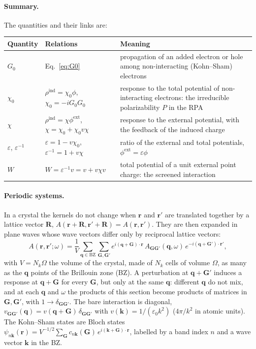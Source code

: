 \documentclass[10pt,a4paper]{paper}
\begin{document}
\paragraph{Summary.} The quantities and their links are:
\begin{center}
\begin{tabular}{p{}p{}>{\raggedright\arraybackslash}p{}}
\toprule
Quantity & Relations & Meaning \\
\midrule
$G_0$ & Eq.~\eqref{eq:G0} &
  propagation of an added electron or hole among non-interacting (Kohn--Sham) electrons \\
$\chi_0$ & $\rho^{\mathrm{ind}} = \chi_0\phi$, \quad $\chi_0 = -iG_0G_0$ &
  response to the total potential of non-interacting electrons: the irreducible polarizability $P$ in the RPA \\
$\chi$ & $\rho^{\mathrm{ind}} = \chi\phi^{\mathrm{ext}}$, \quad $\chi = \chi_0 + \chi_0v\chi$ &
  response to the external potential, with the feedback of the induced charge \\
$\varepsilon$, $\varepsilon^{-1}$ & $\varepsilon = 1 - v\chi_0$, \quad $\varepsilon^{-1} = 1 + v\chi$ &
  ratio of the external and total potentials, $\phi^{\mathrm{ext}} = \varepsilon\phi$ \\
$W$ & $W = \varepsilon^{-1}v = v + v\chi v$ &
  total potential of a unit external point charge: the screened interaction \\
\bottomrule
\end{tabular}
\end{center}

\paragraph{Periodic systems.} In a crystal the kernels do not change when $\bm{r}$ and $\bm{r}'$ are translated
together by a lattice vector $\bm{R}$, $A(\bm{r} + \bm{R},\bm{r}' + \bm{R}) = A(\bm{r},\bm{r}')$. They are then
expanded in plane waves whose wave vectors differ only by reciprocal lattice vectors:
\begin{equation}
A(\bm{r},\bm{r}';\omega) = \frac{1}{V}\sum_{\bm{q}\in\mathrm{BZ}}\sum_{\bm{G},\bm{G}'}
e^{i(\bm{q} + \bm{G})\cdot\bm{r}}\,A_{\bm{G}\bm{G}'}(\bm{q},\omega)\,e^{-i(\bm{q} + \bm{G}')\cdot\bm{r}'} ,
\label{eq:A_qG}
\end{equation}
with $V = N_k\Omega$ the volume of the crystal, made of $N_k$ cells of volume $\Omega$, as many as the $\bm{q}$ points
of the Brillouin zone (BZ). A perturbation at $\bm{q} + \bm{G}'$ induces a response at $\bm{q} + \bm{G}$ for every
$\bm{G}$, but only at the same $\bm{q}$: different $\bm{q}$ do not mix, and at each $\bm{q}$ and $\omega$ the products
of this section become products of matrices in $\bm{G},\bm{G}'$, with $1 \to \delta_{\bm{G}\bm{G}'}$. The bare
interaction is diagonal, $v_{\bm{G}\bm{G}'}(\bm{q}) = v(\bm{q} + \bm{G})\,\delta_{\bm{G}\bm{G}'}$ with
$v(\bm{k}) = 1/(\varepsilon_0 k^2)$ ($4\pi/k^2$ in atomic units). The Kohn--Sham states are Bloch states
$\psi_{n\bm{k}}(\bm{r}) = V^{-1/2}\sum_{\bm{G}} c_{n\bm{k}}(\bm{G})\,e^{i(\bm{k} + \bm{G})\cdot\bm{r}}$, labelled by a
band index $n$ and a wave vector $\bm{k}$ in the BZ.
\end{document}
